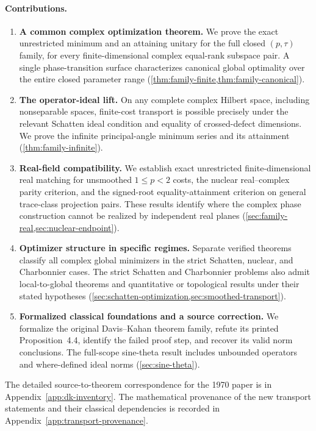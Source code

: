 \documentclass[11pt]{article}
\begin{document}
\paragraph{Contributions.}
\begin{enumerate}
 \item \textbf{A common complex optimization theorem.} We prove the exact
 unrestricted minimum and an attaining unitary for the full closed
 $(p,\tau)$ family, for every finite-dimensional complex equal-rank
 subspace pair. A single phase-transition surface characterizes
 canonical global optimality over the entire closed parameter range
 (\cref{thm:family-finite,thm:family-canonical}).
 \item \textbf{The operator-ideal lift.} On any complete complex Hilbert
 space, including nonseparable spaces, finite-cost transport is possible
 precisely under the relevant Schatten ideal condition and equality of
 crossed-defect dimensions. We prove the infinite principal-angle
 minimum series and its attainment
 (\cref{thm:family-infinite}).
 \item \textbf{Real-field compatibility.} We establish exact unrestricted
 finite-dimensional real matching for unsmoothed $1\le p<2$ costs,
 the nuclear real--complex parity criterion, and the signed-root
 equality-attainment criterion on general trace-class projection pairs.
 These results identify where the complex phase construction cannot be
 realized by independent real planes (\cref{sec:family-real,sec:nuclear-endpoint}).
 \item \textbf{Optimizer structure in specific regimes.} Separate verified
 theorems classify all complex global minimizers in the strict Schatten,
 nuclear, and Charbonnier cases. The strict Schatten and Charbonnier
 problems also admit local-to-global theorems and quantitative or
 topological results under their stated hypotheses
 (\cref{sec:schatten-optimization,sec:smoothed-transport}).
 \item \textbf{Formalized classical foundations and a source correction.}
 We formalize the original Davis--Kahan theorem family, refute its
 printed Proposition~4.4, identify the failed proof step, and recover
 its valid norm conclusions. The full-scope sine-theta result includes
 unbounded operators and where-defined ideal norms
 (\cref{sec:sine-theta}).
\end{enumerate}

The detailed source-to-theorem correspondence for the 1970 paper is in
Appendix~\ref{app:dk-inventory}. The mathematical provenance of the
new transport statements and their classical dependencies is recorded
in Appendix~\ref{app:transport-provenance}.
\end{document}

